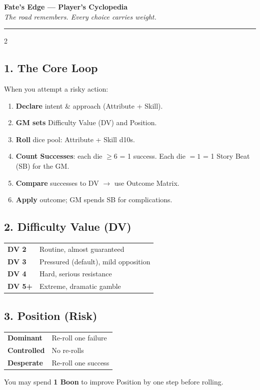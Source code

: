 \documentclass[10pt,landscape]{article}
\begin{document}



\begin{center}
{\huge \textbf{Fate's Edge --- Player's Cyclopedia}} \\[0.2em]
\small \textit{The road remembers. Every choice carries weight.}
\end{center}
\vspace{-0.5ex}
\hrule
\vspace{1ex}
\begin{multicols}{2}

\subsection*{1. The Core Loop}
When you attempt a risky action:
\begin{enumerate}
    \item \textbf{Declare} intent \& approach (Attribute + Skill).
    \item \textbf{GM sets} Difficulty Value (DV) and Position.
    \item \textbf{Roll} dice pool: Attribute + Skill d10s.
    \item \textbf{Count Successes}: each die $\ge 6$ = 1 success. Each die $=1$ = 1 Story Beat (SB) for the GM.
    \item \textbf{Compare} successes to DV $\rightarrow$ use Outcome Matrix.
    \item \textbf{Apply} outcome; GM spends SB for complications.
\end{enumerate}

\subsection*{2. Difficulty Value (DV)}
\begin{tabularx}{\linewidth}{@{} l X @{}}
\textbf{DV 2} & Routine, almost guaranteed \\
\textbf{DV 3} & Pressured (default), mild opposition \\
\textbf{DV 4} & Hard, serious resistance \\
\textbf{DV 5+} & Extreme, dramatic gamble \\
\end{tabularx}

\subsection*{3. Position (Risk)}
\begin{tabularx}{\linewidth}{@{} l X @{}}
\textbf{Dominant}   & Re-roll one failure \\
\textbf{Controlled} & No re-rolls \\
\textbf{Desperate}  & Re-roll one success \\
\end{tabularx}
\vspace{0.5ex}
You may spend \textbf{1 Boon} to improve Position by one step before rolling.


\end{multicols}
\end{document}
